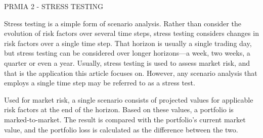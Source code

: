 PRMIA 2 - STRESS TESTING

Stress testing is a simple form of scenario analysis. Rather than consider the evolution of risk factors over several time steps, stress testing considers changes in risk factors over a single time step. That horizon is usually a single trading day, but stress testing can be considered over longer horizons—a week, two weeks, a quarter or even a year. Usually, stress testing is used to assess market risk, and that is the application this article focuses on. However, any scenario analysis that employs a single time step may be referred to as a stress test.

Used for market risk, a single scenario consists of projected values for applicable risk factors at the end of the horizon. Based on these values, a portfolio is marked-to-market. The result is compared with the portfolio's current market value, and the portfolio loss is calculated as the difference between the two.


 



